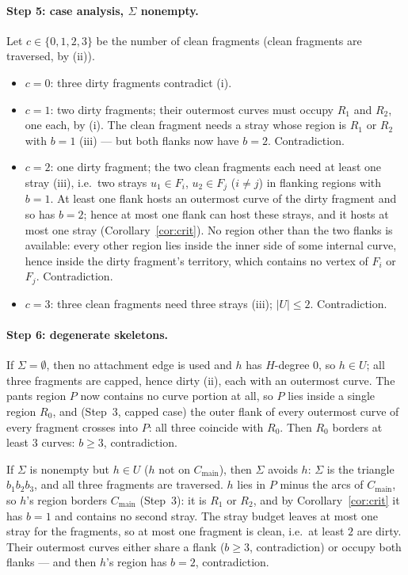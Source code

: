 \documentclass[11pt]{article}
\theoremstyle{remark}
\newcommand{\Cmain}{C_{\mathrm{main}}}
\begin{document}
\paragraph{Step 5: case analysis, $\Sigma$ nonempty.}
Let $c\in\{0,1,2,3\}$ be the number of clean fragments (clean fragments
are traversed, by (ii)).
\begin{itemize}
\item $c=0$: three dirty fragments contradict (i).
\item $c=1$: two dirty fragments; their outermost curves must occupy
$R_1$ and $R_2$, one each, by (i). The clean fragment needs a stray
whose region is $R_1$ or $R_2$ with $b=1$ (iii) --- but both flanks now
have $b=2$. Contradiction.
\item $c=2$: one dirty fragment; the two clean fragments each need at
least one stray (iii), i.e.\ two strays $u_1\in F_i$, $u_2\in F_j$
($i\ne j$) in flanking regions with $b=1$. At least one flank hosts an
outermost curve of the dirty fragment and so has $b=2$; hence at most
one flank can host these strays, and it hosts at most one stray
(Corollary~\ref{cor:crit}). No region other than the two flanks is
available: every other region lies inside the inner side of some
internal curve, hence inside the dirty fragment's territory, which
contains no vertex of $F_i$ or $F_j$. Contradiction.
\item $c=3$: three clean fragments need three strays (iii); $|U|\le 2$.
Contradiction.
\end{itemize}

\paragraph{Step 6: degenerate skeletons.}
If $\Sigma=\emptyset$, then no attachment edge is used and $h$ has
$H$-degree $0$, so $h\in U$; all three fragments are capped, hence dirty
(ii), each with an outermost curve. The pants region $P$ now contains no
curve portion at all, so $P$ lies inside a single region $R_0$, and
(Step~3, capped case) the outer flank of every outermost curve of every
fragment crosses into $P$: all three coincide with $R_0$. Then $R_0$
borders at least $3$ curves: $b\ge 3$, contradiction.

If $\Sigma$ is nonempty but $h\in U$ ($h$ not on $\Cmain$), then
$\Sigma$ avoids $h$: $\Sigma$ is the triangle $b_1b_2b_3$, and all three
fragments are traversed. $h$ lies in $P$ minus the arcs of $\Cmain$, so
$h$'s region borders $\Cmain$ (Step~3): it is $R_1$ or $R_2$, and by
Corollary~\ref{cor:crit} it has $b=1$ and contains no second stray. The
stray budget leaves at most one stray for the fragments, so at most one
fragment is clean, i.e.\ at least $2$ are dirty. Their outermost curves
either share a flank ($b\ge 3$, contradiction) or occupy both flanks ---
and then $h$'s region has $b=2$, contradiction.
\end{document}
